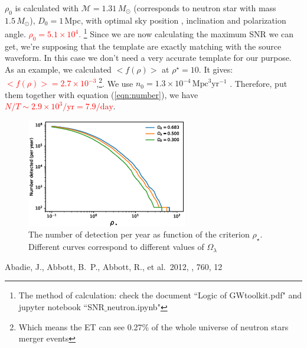 \documentclass[fleqn,usenatbib]{mnras}
\begin{document}
$\rho_0$ is calculated with $\mathcal{M}=1.31\,M_\odot$ (corresponds to neutron star with mass $1.5\,M_\odot$), $D_0=1$\,Mpc, with optimal sky position , inclination and polarization angle. \textcolor{red}{$\rho_0=5.1\times10^4$.} \footnote{The method of calculation: check the document ``Logic of GWtoolkit.pdf" and jupyter notebook ``SNR$\_$neutron.ipynb"} Since we are now calculating the maximum SNR we can get, we're supposing that the template are exactly matching with the source waveform. In this case we don't need a very accurate template for our purpose. As an example, we calculated $<f(\rho)>$ at $\rho^\star=10$. It gives: \textcolor{red}{$<f(\rho)>=2.7\times10^{-3}$},\footnote{Which means the ET can see 0.27\% of the whole universe of neutron stars merger events}. We use $n_0=1.3\times10^{-4}\,\text{Mpc}^3\text{yr}^{-1}$ \citep{2012ApJ...760...12A}. Therefore, put them together with equation (\ref{eqn:number}), we have \textcolor{red}{$N/T\sim2.9\times10^3/\text{yr}=7.9/\text{day}$}. 
\begin{figure}
    \centering
    \includegraphics[width=7cm]{NvsR.eps}
    \caption{The number of detection per year as function of the criterion $\rho_\star$. Different curves correspond to different values of $\Omega_\lambda$}
    \label{fig:my_label}
\end{figure}
\begin{thebibliography}{99}
 Abadie, J., Abbott, B.~P., Abbott, R., et al.\ 2012, \apj, 760, 12
\end{thebibliography}
\end{document}
